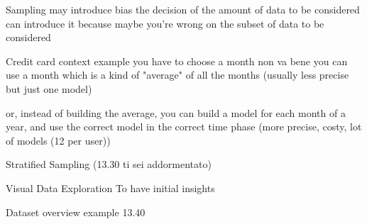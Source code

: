         Sampling may introduce bias 
            the decision of the amount of data to be considered can introduce it because maybe you're wrong on the subset of data to be considered 

            Credit card context example
                you have to choose a month 
                    non va bene
                    you can use a month which is a kind of "average" of all the months (usually less precise but just one model)

                    or, instead of building the average, you can build a model for each month of a year, and use the correct model in the correct time phase (more precise, costy, lot of models (12 per user))

        Stratified Sampling (13.30 ti sei addormentato)

        Visual Data Exploration 
            To have initial insights
            
        Dataset overview example 13.40